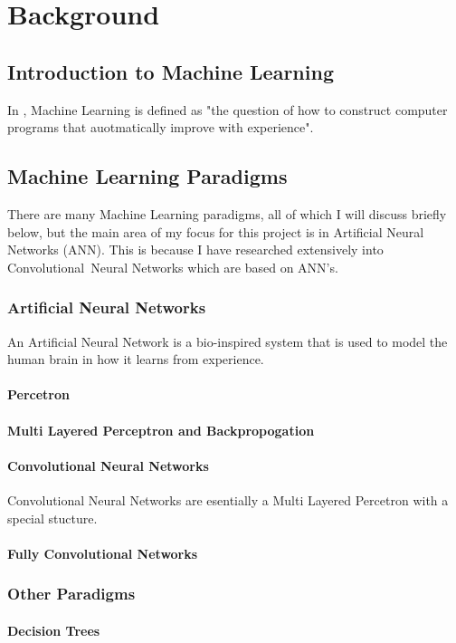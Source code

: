 \chapter{Background}
\label{background}

\section{Introduction to Machine Learning}
In \textcite{ML}, Machine Learning is defined as "the question of how to
construct computer programs that auotmatically improve with experience".

\section{Machine Learning Paradigms}
There are many Machine Learning paradigms, all of which I will
discuss briefly below, but the main area of my focus for this project is in
Artificial Neural Networks (ANN). This is because I have researched extensively into Convolutional Neural Networks which are based on ANN's.
\subsection{Artificial Neural Networks}
An Artificial Neural Network is a bio-inspired system that is used to model the human brain in how it learns from experience.
\subsubsection{Percetron}
\subsubsection{Multi Layered Perceptron and Backpropogation}
\subsubsection{Convolutional Neural Networks}
Convolutional Neural Networks are esentially a Multi Layered Percetron with a
special stucture.
\subsubsection{Fully Convolutional Networks}

\subsection{Other Paradigms}
\subsubsection{Decision Trees}
